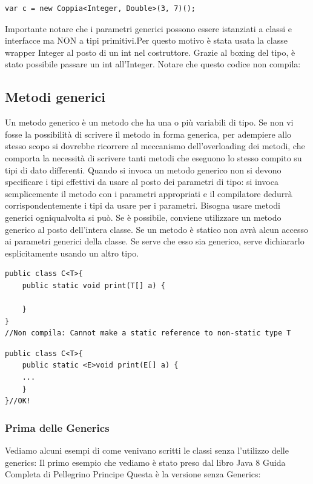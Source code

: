 \begin{lstlisting}
var c = new Coppia<Integer, Double>(3, 7)();
\end{lstlisting}
Importante notare che i parametri generici possono essere istanziati a classi e interfacce ma {\color{error}NON} a tipi primitivi.Per questo motivo è stata usata la classe wrapper Integer al posto di un int nel costruttore. Grazie al boxing del tipo, è stato possibile passare un int all’Integer. Notare che questo codice non compila:
\subsection{Metodi generici}
Un metodo generico è un metodo che ha una o più variabili di tipo. Se non vi fosse la possibilità di scrivere il metodo in forma
generica, per adempiere allo stesso scopo si dovrebbe ricorrere al meccanismo dell’overloading dei metodi, che comporta la necessità di scrivere tanti metodi che eseguono lo stesso compito su tipi di dato differenti. 
Quando si invoca un metodo generico non si devono specificare i tipi effettivi da usare al posto dei parametri di tipo: si invoca semplicemente il metodo con i parametri appropriati e il compilatore dedurrà corrispondentemente i tipi da usare per i parametri. Bisogna usare metodi generici ogniqualvolta si può. Se è possibile, conviene utilizzare un metodo generico al posto dell'intera classe. Se un metodo è statico non avrà alcun accesso ai parametri generici della classe. Se serve che esso sia generico, serve dichiararlo esplicitamente usando un altro tipo.
\begin{lstlisting}
public class C<T>{
	public static void print(T[] a) {
	
	}
} 
//Non compila: Cannot make a static reference to non-static type T
\end{lstlisting}
\begin{lstlisting}
public class C<T>{
	public static <E>void print(E[] a) {
	...
	}
}//OK!
\end{lstlisting}
\subsubsection{Prima delle Generics}
Vediamo alcuni esempi di come venivano scritti le classi senza l'utilizzo delle generics:
Il primo esempio che vediamo è stato preso dal libro Java 8 Guida Completa di Pellegrino Principe
Questa è la versione senza Generics:

